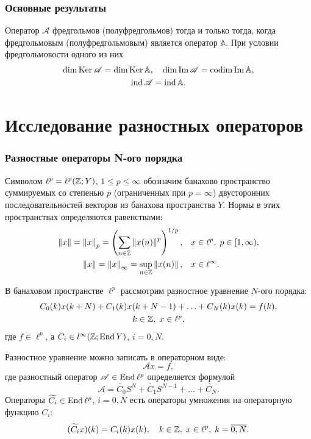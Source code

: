 \documentclass{beamer}
\begin{document}
\begin{frame}
\frametitle{Основные результаты}

\begin{theorem}\label{th:inverse}
    Оператор $\mathcal A$ фредгольмов (полуфредгольмов) тогда и только тогда, когда фредгольмовым (полуфредгольмовым) является оператор $\mathbb A$. При условии фредгольмовости одного из них
    \begin{gather*}
    \dim \operatorname{Ker} \mathcal A = \dim \operatorname{Ker} \mathbb A, \quad \dim \operatorname{Im} \mathcal A = \operatorname{codim} \operatorname{Im} \mathbb A, \\
    \operatorname{ind} \mathcal A = \operatorname{ind} \mathbb A.
    \end{gather*}
\end{theorem}

\end{frame}

\section{Исследование разностных операторов}

\begin{frame}
\frametitle{Разностные операторы N-ого порядка}

Символом $\ell^p = \ell^p(\mathbb{Z}; Y)$, $1 \leq p \leq \infty$ обозначим банахово пространство суммируемых со степенью $p$ (ограниченных при $p = \infty$) двусторонних последовательностей векторов из банахова пространства $Y$. Нормы в этих пространствах определяются равенствами:
\begin{align*}
    \left\|x\right\| = \left\|x\right\|_p = \left(\sum_{n \in \mathbb{Z}} \left\|x(n)\right\|^p\right)^{1/p}, \quad &x \in \ell^p, \; p \in [1, \infty), \\
    \left\|x\right\| = \left\|x\right\|_\infty = \sup_{n\in \mathbb{Z}} \left\|x(n)\right\|, \quad &x \in \ell^\infty.
\end{align*}
\end{frame}

\begin{frame}
В банаховом пространстве $\ell^p$ рассмотрим разностное уравнение $N$-ого порядка:
\begin{gather*}
C_0(k) x(k + N) + C_1(k) x(k + N - 1) + \dotsc + C_{N}(k) x(k) = f(k), \\
k \in \mathbb{Z}, \; x \in \ell^p,
\end{gather*}
где $f \in \ell^p$, а $C_i \in l^\infty(\mathbb{Z}; \operatorname{End} Y)$, $i = \overline{0,N}$.
\end{frame}


\begin{frame}
Разностное уравнение можно записать в операторном виде:
\[  \mathcal A x = f, \]
где разностный оператор $ \mathcal A \in \operatorname{End} \ell^p$ определяется формулой
\begin{equation*}
\mathcal A = \widetilde{C_0} S^N + \widetilde{C_1} S^{N - 1} + \dotsc + \widetilde{C_N}.
\end{equation*}
Операторы $\widetilde{C_i} \in \operatorname{End} \ell^p$, $i = \overline{0,N}$ есть операторы умножения на операторную функцию $C_i$:
\[ (\widetilde{C_i}x)(k) = C_i(k)x(k), \quad k \in \mathbb{Z}, \; x \in \ell^p, \; k = \overline{0,N}. \]
\end{frame}
\end{document}

